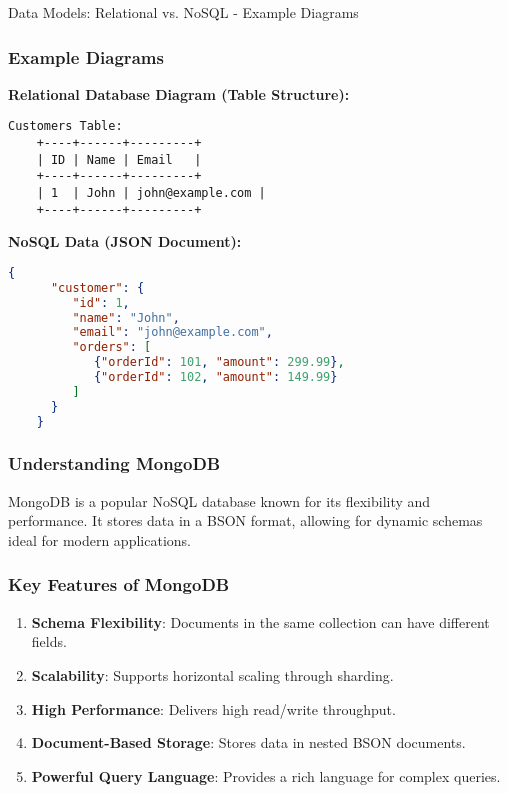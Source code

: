 \documentclass[aspectratio=169]{beamer}
\begin{document}
\begin{frame}[fragile]{Data Models: Relational vs. NoSQL - Example Diagrams}
    \frametitle{Example Diagrams}
    \textbf{Relational Database Diagram (Table Structure):}

    \begin{lstlisting}[basicstyle=\ttfamily]
    Customers Table:
    +----+------+---------+
    | ID | Name | Email   |
    +----+------+---------+
    | 1  | John | john@example.com |
    +----+------+---------+
    \end{lstlisting}

    \textbf{NoSQL Data (JSON Document):}
    \begin{lstlisting}[language=json]
    {
      "customer": {
         "id": 1,
         "name": "John",
         "email": "john@example.com",
         "orders": [
            {"orderId": 101, "amount": 299.99},
            {"orderId": 102, "amount": 149.99}
         ]
      }
    }
    \end{lstlisting}
\end{frame}

\begin{frame}[fragile]
    \frametitle{Understanding MongoDB}
    MongoDB is a popular NoSQL database known for its flexibility and performance. It stores data in a BSON format, allowing for dynamic schemas ideal for modern applications.
\end{frame}

\begin{frame}[fragile]
    \frametitle{Key Features of MongoDB}
    \begin{enumerate}
        \item \textbf{Schema Flexibility}: Documents in the same collection can have different fields.
        \item \textbf{Scalability}: Supports horizontal scaling through sharding.
        \item \textbf{High Performance}: Delivers high read/write throughput.
        \item \textbf{Document-Based Storage}: Stores data in nested BSON documents.
        \item \textbf{Powerful Query Language}: Provides a rich language for complex queries.
    \end{enumerate}
\end{frame}
\end{document}
